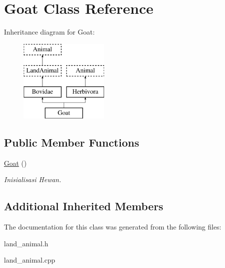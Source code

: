 \hypertarget{class_goat}{}\section{Goat Class Reference}
\label{class_goat}
Inheritance diagram for Goat\+:\begin{figure}[H]
\begin{center}
\leavevmode
\includegraphics[height=4.000000cm]{class_goat}
\end{center}
\end{figure}
\subsection*{Public Member Functions}
\begin{DoxyCompactItemize}
\item 
\hyperlink{class_goat_acf506b76c8503c9749df191a92dc99f9}{Goat} ()\hypertarget{class_goat_acf506b76c8503c9749df191a92dc99f9}{}\label{class_goat_acf506b76c8503c9749df191a92dc99f9}

\begin{DoxyCompactList}\small\item\em Inisialisasi Hewan. \end{DoxyCompactList}\end{DoxyCompactItemize}
\subsection*{Additional Inherited Members}


The documentation for this class was generated from the following files\+:\begin{DoxyCompactItemize}
\item 
land\+\_\+animal.\+h\item 
land\+\_\+animal.\+cpp\end{DoxyCompactItemize}
